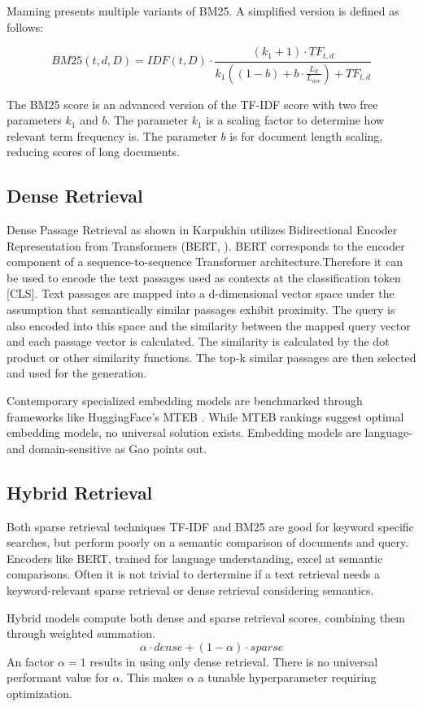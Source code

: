Manning \cite{Manning.2009} presents multiple variants of BM25. A simplified version is defined as follows:

$$BM25(t, d, D) = IDF(t, D) \cdot \frac{(k_1 + 1) \cdot TF_{t, d}}{k_1((1-b)+b \cdot \frac{L_d}{L_{ave}}) + TF_{t, d}}$$


The BM25 score is an advanced version of the TF-IDF score with two free parameters $k_1$ and $b$. The parameter $k_1$ is a scaling factor to determine how relevant term frequency is. The parameter $b$ is for document length scaling, reducing scores of long documents. 

\subsection{Dense Retrieval}
\label{sec:dense_retrieval}

Dense Passage Retrieval as shown in Karpukhin \cite{karpukhin2020densepassageretrievalopendomain} utilizes Bidirectional Encoder Representation from Transformers (BERT, \cite{devlin2019bertpretrainingdeepbidirectional}). BERT corresponds to the encoder component of a sequence-to-sequence Transformer architecture.Therefore it can be used to encode the text passages used as contexts at the classification token [CLS]. Text passages are mapped into a d-dimensional vector space under the assumption that semantically similar passages exhibit proximity. The query is also encoded into this space and the similarity between the mapped query vector and each passage vector is calculated. The similarity is calculated by the dot product or other similarity functions. The top-k similar passages are then selected and used for the generation.

Contemporary specialized embedding models are benchmarked through frameworks like HuggingFace's MTEB \cite{muennighoff2022mteb}. While MTEB rankings suggest optimal embedding models, no universal solution exists. Embedding models are language- and domain-sensitive as Gao \cite{Gao.18.12.2023} points out. 

\subsection{Hybrid Retrieval}
\label{sec:hybrid_retrieval}

Both sparse retrieval techniques TF-IDF and BM25 are good for keyword specific searches, but perform poorly on a semantic comparison of documents and query. Encoders like BERT, trained for language understanding, excel at semantic comparisons. Often it is not trivial to dertermine if a text retrieval needs a keyword-relevant sparse retrieval or dense retrieval considering semantics. 

Hybrid models compute both dense and sparse retrieval scores, combining them through weighted summation.
$$\alpha \cdot dense+(1 - \alpha )\cdot sparse$$ An factor $\alpha=1$ results in using only dense retrieval. There is no universal performant value for $\alpha$. This makes $\alpha$ a tunable hyperparameter requiring optimization.
